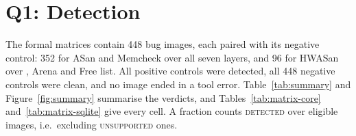 \section{Q1: Detection}
\label{sec:q1}

The formal matrices contain 448 bug images, each paired with its negative control: 352 for ASan and Memcheck over all seven layers, and 96 for HWASan over , Arena and Free list. All positive controls were detected, all 448 negative controls were clean, and no image ended in a tool error. Table~\ref{tab:summary} and Figure~\ref{fig:summary} summarise the verdicts, and Tables~\ref{tab:matrix-core} and~\ref{tab:matrix-sqlite} give every cell. A fraction counts
\textsc{detected} over eligible images, i.e.\ excluding \textsc{unsupported} ones.

\begin{table}[!htbp]
\centering\small

\caption{Bugs detected out of eligible bugs, per allocator layer, without (plain) and with the tool's
annotation. ``n/a'': the layer has no annotated variant; ``--'': not run. The  layer was also built with annotation on and gave identical results for ASan and Memcheck; HWASan detected case 4 on that build (\S\ref{sec:q1-precision}).}
\label{tab:summary}
\end{table}

